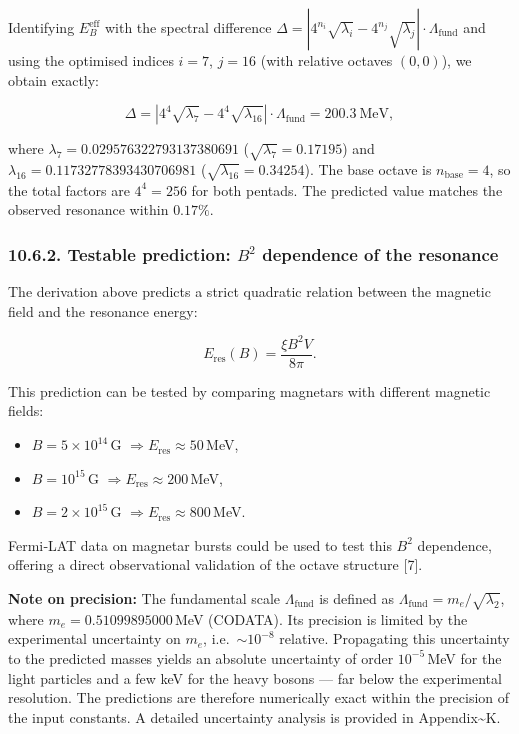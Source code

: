 \documentclass[11pt]{article}
\providecommand{\tightlist}{\setlength{\itemsep}{2pt}\setlength{\parskip}{6pt}}
\providecommand{\tightlist}{%
  \setlength{\itemsep}{2pt}\setlength{\parskip}{6pt}
}
\begin{document}
Identifying \(E_B^{\text{eff}}\) with the spectral difference
\(\Delta = \left| 4^{n_i}\sqrt{\lambda_i} - 4^{n_j}\sqrt{\lambda_j} \right| \cdot \Lambda_{\text{fund}}\)
and using the optimised indices \(i=7\), \(j=16\) (with relative octaves
\((0,0)\)), we obtain exactly:

\[
\Delta = \left| 4^{4}\sqrt{\lambda_{7}} - 4^{4}\sqrt{\lambda_{16}} \right| \cdot \Lambda_{\text{fund}} = 200.3\ \text{MeV},
\]

where \(\lambda_{7} = 0.029576322793137380691\)
(\(\sqrt{\lambda_{7}} = 0.17195\)) and
\(\lambda_{16} = 0.11732778393430706981\)
(\(\sqrt{\lambda_{16}} = 0.34254\)). The base octave is
\(n_{\text{base}}=4\), so the total factors are \(4^{4} = 256\) for both
pentads. The predicted value matches the observed resonance within
\(0.17\%\).

\hypertarget{testable-prediction-b2-dependence-of-the-resonance}{%
\subsubsection{\texorpdfstring{10.6.2. Testable prediction: \(B^2\)
dependence of the
resonance}{10.6.2. Testable prediction: B\^{}2 dependence of the resonance}}\label{testable-prediction-b2-dependence-of-the-resonance}}

The derivation above predicts a strict quadratic relation between the
magnetic field and the resonance energy:

\[
E_{\text{res}}(B) = \frac{\xi B^2 V}{8\pi}.
\]

This prediction can be tested by comparing magnetars with different
magnetic fields:

\begin{itemize}
\tightlist
\item
  \(B = 5 \times 10^{14}\)\,G
  \(\Rightarrow E_{\text{res}} \approx 50\)\,MeV,
\item
  \(B = 10^{15}\)\,G \(\Rightarrow E_{\text{res}} \approx 200\)\,MeV,
\item
  \(B = 2 \times 10^{15}\)\,G
  \(\Rightarrow E_{\text{res}} \approx 800\)\,MeV.
\end{itemize}

Fermi‑LAT data on magnetar bursts could be used to test this \(B^2\)
dependence, offering a direct observational validation of the octave
structure {[}7{]}.

\textbf{Note on precision:} The fundamental scale
\(\Lambda_{\text{fund}}\) is defined as
\(\Lambda_{\text{fund}} = m_e / \sqrt{\lambda_2}\), where
\(m_e = 0.51099895000\)\,MeV (CODATA). Its precision is limited by the
experimental uncertainty on \(m_e\), i.e.~\(\sim 10^{-8}\) relative.
Propagating this uncertainty to the predicted masses yields an absolute
uncertainty of order \(10^{-5}\)\,MeV for the light particles and a few
keV for the heavy bosons --- far below the experimental resolution. The
predictions are therefore numerically exact within the precision of the
input constants. A detailed uncertainty analysis is provided in
Appendix\textasciitilde K.
\end{document}
